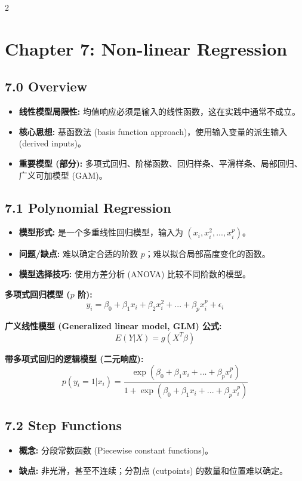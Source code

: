 \documentclass[6pt,a4paper]{ctexart}
\begin{document}
\begin{multicols}{2}
\RaggedRight

\section*{Chapter 7: Non-linear Regression}

\subsection*{7.0 Overview}
\begin{itemize}
    \item \textbf{线性模型局限性:} 均值响应必须是输入的线性函数，这在实践中通常不成立。
    \item \textbf{核心思想:} 基函数法 (basis function approach)，使用输入变量的派生输入 (derived inputs)。
    \item \textbf{重要模型 (部分):} 多项式回归、阶梯函数、回归样条、平滑样条、局部回归、广义可加模型 (GAM)。
\end{itemize}

\subsection*{7.1 Polynomial Regression}
\begin{itemize}
    \item \textbf{模型形式:} 是一个多重线性回归模型，输入为 $(x_{i},x_{i}^{2},...,x_{i}^{p})$。
    \item \textbf{问题/缺点:} 难以确定合适的阶数 $p$；难以拟合局部高度变化的函数。
    \item \textbf{模型选择技巧:} 使用方差分析 (ANOVA) 比较不同阶数的模型。
\end{itemize}

\textbf{多项式回归模型 ($p$ 阶):}
$$ y_{i}=\beta_{0}+\beta_{1}x_{i}+\beta_{2}x_{i}^{2}+...+\beta_{p}x_{i}^{p}+\epsilon_{i} $$

\textbf{广义线性模型 (Generalized linear model, GLM) 公式:}
$$ E(Y|X)=g(X^{T}\beta) $$

\textbf{带多项式回归的逻辑模型 (二元响应):}
$$ p(y_{i}=1|x_{i})=\frac{\exp(\beta_{0}+\beta_{1}x_{i}+...+\beta_{p}x_{i}^{p})}{1+\exp(\beta_{0}+\beta_{1}x_{i}+...+\beta_{p}x_{i}^{p})} $$

\subsection*{7.2 Step Functions}
\begin{itemize}
    \item \textbf{概念:} 分段常数函数 (Piecewise constant functions)。
    \item \textbf{缺点:} 非光滑，甚至不连续；分割点 (cutpoints) 的数量和位置难以确定。
\end{itemize}


\end{multicols}
\end{document}
